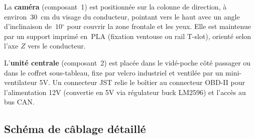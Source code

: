 \documentclass[12pt,a4paper]{report}
\newcommand{\degr}{\ensuremath{^{\circ}}}
\begin{document}
La \textbf{cam\'era} (composant~1) est positionn\'ee sur la colonne de direction, \`a environ~30~cm du visage du conducteur, pointant vers le haut avec un angle d'inclinaison de~$10\degr$ pour couvrir la zone frontale et les yeux. Elle est maintenue par un support imprim\'e en~PLA (fixation ventouse ou rail T-slot), orient\'e selon l'axe $Z$ vers le conducteur.

L'\textbf{unit\'e centrale} (composant~2) est plac\'ee dans le vid\'e-poche c\^ot\'e passager ou dans le coffret sous-tableau, fixe par velcro industriel et ventil\'ee par un mini-ventilateur 5V. Un connecteur JST relie le bo\^itier au connecteur OBD-II pour l'alimentation 12V (convertie en 5V via r\'egulateur buck LM2596) et l'acc\`es au bus CAN.

\subsection{Sch\'ema de c\^ablage d\'etaill\'e}
\end{document}
